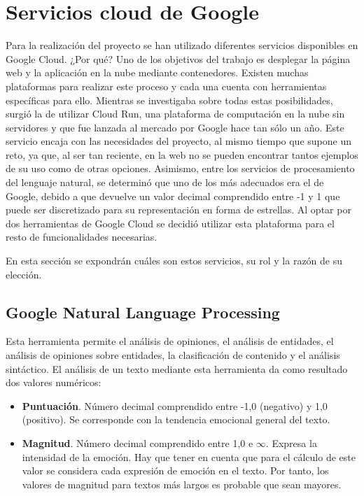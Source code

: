 \section{Servicios cloud de Google}

Para la realización del proyecto se han utilizado diferentes servicios disponibles en Google Cloud. ¿Por qué? Uno de los objetivos del trabajo es desplegar la página web y la aplicación en la nube mediante contenedores. Existen muchas plataformas para realizar este proceso y cada una cuenta con herramientas específicas para ello. Mientras se investigaba sobre todas estas posibilidades, surgió la de utilizar Cloud Run, una plataforma de computación en la nube sin servidores y que fue lanzada al mercado por Google hace tan sólo un año. Este servicio encaja con las necesidades del proyecto, al mismo tiempo que supone un reto, ya que, al ser tan reciente, en la web no se pueden encontrar tantos ejemplos de su uso como de otras opciones. Asimismo, entre los servicios de procesamiento del lenguaje natural, se determinó que uno de los más adecuados era el de Google, debido a que devuelve un valor decimal comprendido entre -1 y 1 que puede ser discretizado para su representación en forma de estrellas. Al optar por dos herramientas de Google Cloud se decidió utilizar esta plataforma para el resto de funcionalidades necesarias.

En esta sección se expondrán cuáles son estos servicios, su rol y la razón de su elección.

\subsection{Google Natural Language Processing}

Esta herramienta permite el análisis de opiniones, el análisis de entidades, el análisis de opiniones sobre entidades, la clasificación de contenido y el análisis sintáctico. El análisis de un texto mediante esta herramienta da como resultado dos valores numéricos:

\begin{itemize}
    \item \textbf{Puntuación}. Número decimal comprendido entre -1,0 (negativo) y 1,0 (positivo). Se corresponde con la tendencia emocional general del texto.
    \item \textbf{Magnitud}. Número decimal comprendido entre 1,0 e $\infty$. Expresa la intensidad de la emoción. Hay que tener en cuenta que para el cálculo de este valor se considera cada expresión de emoción en el texto. Por tanto, los valores de magnitud para textos más largos es probable que sean mayores.
\end{itemize}

